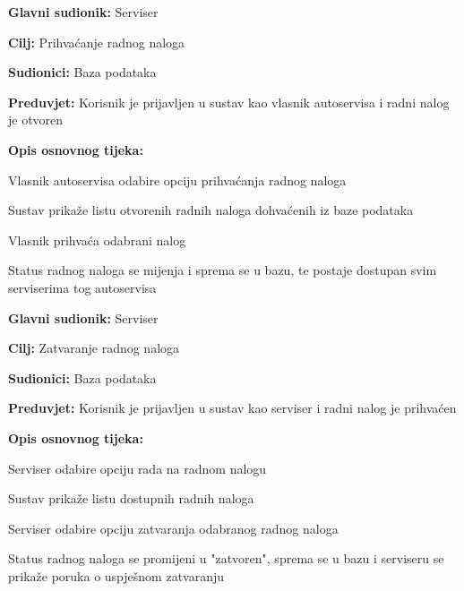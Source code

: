 \noindent {}
\begin{packed_item}

	\item \textbf{Glavni sudionik: } Serviser
	\item  \textbf{Cilj:} Prihvaćanje radnog naloga
	\item  \textbf{Sudionici:} Baza podataka
	\item  \textbf{Preduvjet:} Korisnik je prijavljen u sustav kao vlasnik autoservisa i radni nalog
	je otvoren
	\item  \textbf{Opis osnovnog tijeka:}

	\item[] \begin{packed_enum}

		\item Vlasnik autoservisa odabire opciju prihvaćanja radnog naloga
		\item Sustav prikaže listu otvorenih radnih naloga dohvaćenih iz baze podataka
		\item Vlasnik prihvaća odabrani nalog
		\item Status radnog naloga se mijenja i sprema se u bazu, te postaje dostupan svim serviserima tog autoservisa

	\end{packed_enum}
\end{packed_item}

\noindent {}
\begin{packed_item}

	\item \textbf{Glavni sudionik: } Serviser
	\item  \textbf{Cilj:} Zatvaranje radnog naloga
	\item  \textbf{Sudionici:} Baza podataka
	\item  \textbf{Preduvjet:} Korisnik je prijavljen u sustav kao serviser i radni nalog
	je prihvaćen
	\item  \textbf{Opis osnovnog tijeka:}

	\item[] \begin{packed_enum}

		\item Serviser odabire opciju rada na radnom nalogu
		\item Sustav prikaže listu dostupnih radnih naloga
		\item Serviser odabire opciju zatvaranja odabranog radnog naloga
		\item Status radnog naloga se promijeni u "zatvoren", sprema se u bazu i serviseru se prikaže poruka o uspješnom zatvaranju

	\end{packed_enum}
\end{packed_item}

